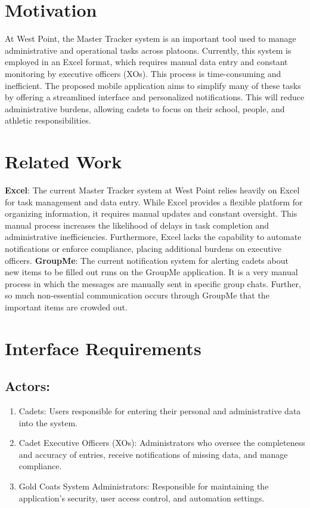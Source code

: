 \documentclass [11pt]{article}
\begin{document}
\section{Motivation}
At West Point, the Master Tracker system is an important tool used to manage administrative and operational tasks across platoons. Currently, this system is employed in an Excel format, which requires manual data entry and constant monitoring by executive officers (XOs). This process is time-consuming and inefficient. The proposed mobile application aims to simplify many of these tasks by offering a streamlined interface and personalized notifications. This will reduce administrative burdens, allowing cadets to focus on their school, people, and athletic responsibilities. 

\section{Related Work}
 \textbf{Excel}: The current Master Tracker system at West Point relies heavily on Excel for task management and data entry. While Excel provides a flexible platform for organizing information, it requires manual updates and constant oversight. This manual process increases the likelihood of delays in task completion and administrative inefficiencies. Furthermore, Excel lacks the capability to automate notifications or enforce compliance, placing additional burdens on executive officers.
 \textbf{GroupMe}: The current notification system for alerting cadets about new items to be filled out runs on the GroupMe application. It is a very manual process in which the messages are manually sent in specific group chats. Further, so much non-essential communication occurs through GroupMe that the important items are crowded out. 

\section{Interface Requirements}
\subsection{Actors:}
\begin{enumerate}
    \item Cadets: Users responsible for entering their personal and administrative data into the system. 
    \item Cadet Executive Officers (XOs): Administrators who oversee the completeness and accuracy of entries, receive notifications of missing data, and manage compliance. 
    \item Gold Coats System Administrators: Responsible for maintaining the application’s security, user access control, and automation settings. 
\end{enumerate}
\end{document}

